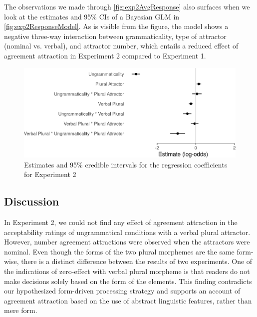 \documentclass[doc,a4paper,man,natbib,floatsintext,noextraspace]{apa6}\usepackage[]{graphicx}\usepackage[]{color}
\begin{document}
The observations we made through \autoref{fig:exp2AvgResponse} also surfaces when we look at the estimates and 95\% CIs of a Bayesian GLM in \autoref{fig:exp2ResponseModel}. As is visible from the figure, the model shows a negative three-way interaction between grammaticality, type of attractor (nominal vs. verbal), and attractor number, which entails a reduced effect of agreement attraction in Experiment 2 compared to Experiment 1. 

\begin{figure}[h]
\centering
\includegraphics[width=\textwidth]{figures/exp2ResponseModelPlot-1.png}
\caption{Estimates and 95\% credible intervals for the regression coefficients for Experiment 2}
\label{fig:exp2ResponseModel}
\end{figure}


\subsection{Discussion} \label{sec:exp2:discussion}


In Experiment 2, we could not find any effect of agreement attraction in the acceptability ratings of ungrammatical conditions with a verbal plural attractor. However, number agreement attractions were observed when the attractors were nominal. Even though the forms of the two plural morphemes are the same form-wise, there is a distinct difference between the results of two experiments. One of the indications of zero-effect with verbal plural morpheme is that readers do not make decisions solely based on the form of the elements. This finding contradicts our hypothesized form-driven processing strategy and supports an account of agreement attraction based on the use of abstract linguistic features, rather than mere form.
\end{document}
